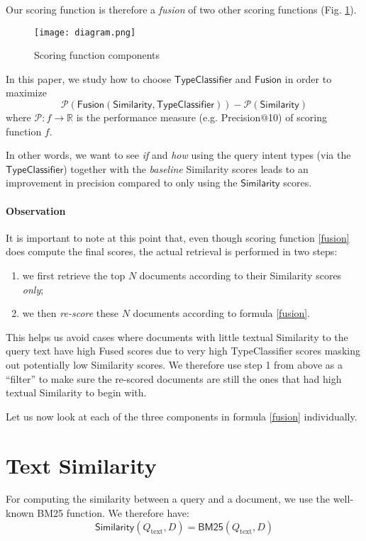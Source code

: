 Our scoring function is therefore a \emph{fusion} of two other scoring functions (Fig. \ref{diagram}).

\begin{figure}[h!]
\centerline{
  \texttt{[image: diagram.png]}
  }
  \caption{Scoring function components}
  \label{diagram}
\end{figure}

In this paper, we study how to choose $\textsf{TypeClassifier}$ and $\textsf{Fusion}$ in order to maximize
\[
 \mathcal{P}(\textsf{Fusion}(\textsf{Similarity}, \textsf{TypeClassifier})) - \mathcal{P}(\textsf{Similarity})
\]
where $\mathcal{P}: f \rightarrow \mathbb{R}$ is the performance measure (e.g. Precision@10) of scoring function $f$.

In other words, we want to see \emph{if} and \emph{how} using the query intent types (via the
$\textsf{TypeClassifier}$) together with the \emph{baseline} \textsf{Similarity} scores
leads to an improvement in precision compared to only using the $\textsf{Similarity}$ scores.

\paragraph{Observation} It is important to note at this point that, even though scoring function \ref{fusion} does
compute the final scores,
the actual retrieval is performed in two steps: 
\begin{enumerate}
 \item we first retrieve the top $N$ documents according to their \textsf{Similarity} scores \emph{only};
 \vspace{-0.2cm}
 \item we then \emph{re-score} these $N$ documents according to formula \ref{fusion}.
\end{enumerate}
This helps us avoid cases where documents with little textual \textsf{Similarity} to the query text
have high \textsf{Fused} scores due to very high \textsf{TypeClassifier} scores masking out potentially low \textsf{Similarity} scores.
We therefore use step 1 from above as a ``filter'' to make sure the re-scored documents are still the ones that had high textual
\textsf{Similarity} to begin with.

Let us now look at each of the three components in formula \ref{fusion} individually.

\section{Text Similarity}
For computing the similarity between a query and a document, we use the well-known BM25 function\cite{bm25}.
We therefore have:
\begin{equation}\label{bm25-formula}
 \textsf{Similarity}(Q_{\text{text}}, D) = \textsf{BM25}(Q_{\text{text}},D)%
\end{equation}

